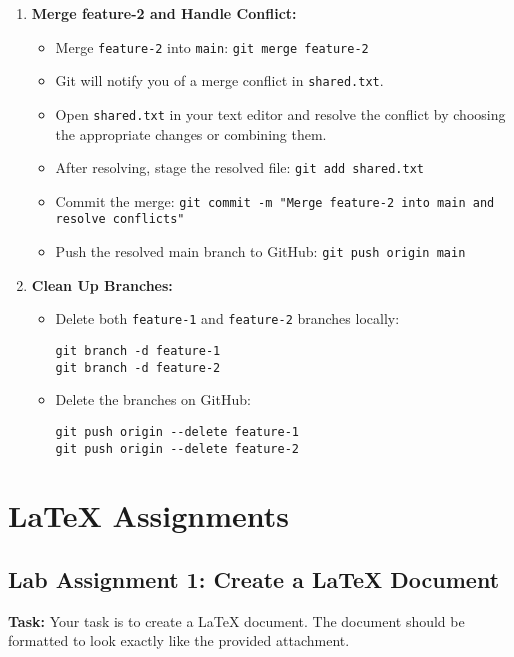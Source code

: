 \documentclass[a4paper,12pt]{article}
\begin{document}
\begin{enumerate}[label=\arabic*.]
    \item \textbf{Merge feature-2 and Handle Conflict:}
    \begin{itemize}
        \item Merge \texttt{feature-2} into \texttt{main}: \texttt{git merge feature-2}
        \item Git will notify you of a merge conflict in \texttt{shared.txt}.
        \item Open \texttt{shared.txt} in your text editor and resolve the conflict by choosing the appropriate changes or combining them.
        \item After resolving, stage the resolved file: \texttt{git add shared.txt}
        \item Commit the merge: \texttt{git commit -m "Merge feature-2 into main and resolve conflicts"}
        \item Push the resolved main branch to GitHub: \texttt{git push origin main}
    \end{itemize}

    \item \textbf{Clean Up Branches:}
    \begin{itemize}
        \item Delete both \texttt{feature-1} and \texttt{feature-2} branches locally:
        \begin{verbatim}
git branch -d feature-1
git branch -d feature-2
        \end{verbatim}
        \item Delete the branches on GitHub:
        \begin{verbatim}
git push origin --delete feature-1
git push origin --delete feature-2
        \end{verbatim}
    \end{itemize}
\end{enumerate}

\newpage
\section{LaTeX Assignments}

\subsection{Lab Assignment 1: Create a LaTeX Document}

\textbf{Task:} Your task is to create a LaTeX document. The document should be formatted to look exactly like the provided attachment.
\end{document}
